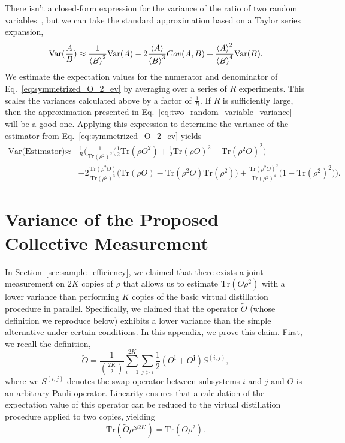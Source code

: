 \documentclass[
amsmath,
amssymb,
aps,
pra,
reprint,
twocolumn,
superscriptaddress,
longbibliography,
showkeys,
floatfix
]{revtex4-1}
\def\tr{\mathrm{Tr}}
\newcommand{\eq}[1]{Eq.~\hyperref[eq:#1]{\ref*{eq:#1}}}
\renewcommand{\sec}[1]{\hyperref[sec:#1]{Section~\ref*{sec:#1}}}
\begin{document}
There isn't a closed-form expression for the variance of the ratio of two random
variables~\cite{Kendall1946-by}, but we can take the standard approximation
based on a Taylor series expansion,
\begin{equation}
  \textrm{Var}(\frac{A}{B}) \approx \frac{1}{\ev{B}^2} \textrm{Var}(A) - 2 \frac{\ev{A}}{\ev{B}^3} Cov(A, B) + \frac{\ev{A}^2}{\ev{B}^4} \textrm{Var}(B).
  \label{eq:two_random_variable_variance}
\end{equation}
We estimate the expectation values for the numerator and denominator of
\eq{symmetrized_O_2_ev} by averaging over a series of \(R\) experiments. 
This scales the variances calculated above by a factor of \(\frac{1}{R}\). 
If \(R\) is sufficiently large, then the approximation presented in
\eq{two_random_variable_variance} will be a good one.
Applying this expression to determine the variance of the estimator from
\eq{symmetrized_O_2_ev} yields
\begin{align}
  \label{eq:rho_2_estimator_variance}
  \textrm{Var(Estimator)} \approx &
                           \frac{1}{R}\Big(\frac{1}{\tr(\rho^2)^2}\big(\frac{1}{2}\tr(\rho O^2) + \frac{1}{2}\tr(\rho O)^2 - \tr(\rho^2 O)^2\big) \\
                         &- 2 \frac{\tr(\rho^2 O)}{\tr(\rho^2)^3}\big(\tr(\rho O) - \tr(\rho^2 O)\tr(\rho^2)\big) + \frac{\tr(\rho^2 O)^2}{\tr(\rho^2)^4}\big(1 - \tr(\rho^2)^2\big)\Big).
                           \nonumber
\end{align}


\section{Variance of the Proposed Collective Measurement}
\label{app:collective_measurement_variance}

In \sec{sample_efficiency}, we claimed that there exists a joint measurement on
\(2K\) copies of \(\rho\) that allows us to estimate \(\tr(O \rho^2)\) with a
lower variance than performing \(K\) copies of the basic virtual distillation
procedure in parallel. Specifically, we claimed that the operator \(\tilde{O}\)
(whose definition we reproduce below) exhibits a lower variance than the simple
alternative under certain conditions. In this appendix, we prove this claim.
First, we recall the definition,
\begin{equation}
  \tilde{O} = \frac{1}{\binom{2K}{2}}\sum_{i=1}^{2K} \sum_{j > i}\frac{1}{2}( O^\textbf{i} + O^\textbf{j})S^{{(i, j)}},
\end{equation}
where we \(S^{(i, j)}\) denotes the swap operator between subsystems \(i\) and
\(j\) and \(O\) is an arbitrary Pauli operator. 
Linearity ensures that a calculation of the expectation value of this operator
can be reduced to the virtual distillation procedure applied to two copies,
yielding
\begin{equation}
  \tr(\tilde{O} \rho^{\otimes 2K}) = \tr(O \rho^2).
  \label{eq:complicated_expression_same_expectation}
\end{equation}
\end{document}
